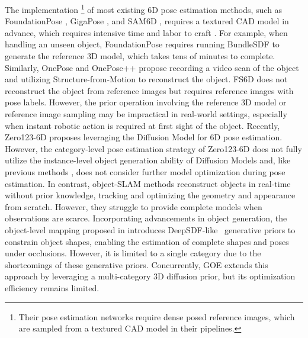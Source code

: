 The implementation \footnote{Their pose estimation networks require dense posed reference images, which are sampled from a textured CAD model in their pipelines.} of most existing 6D pose estimation methods, such as FoundationPose \cite{fp}, GigaPose \cite{gigapose}, and SAM6D \cite{sam6d}, requires a textured CAD model in advance, which requires intensive time and labor to craft \cite{lpr}. For example, when handling an unseen object, FoundationPose \cite{fp} requires running BundleSDF \cite{bundlesdf} to generate the reference 3D model, which takes tens of minutes to complete. Similarly, OnePose \cite{onepose} and OnePose++ \cite{onepose++} propose recording a video scan of the object and utilizing Structure-from-Motion \cite{colmap} to reconstruct the object. FS6D \cite{fs6d} does not reconstruct the object from reference images but requires reference images with pose labels. However, the prior operation involving the reference 3D model or reference image sampling may be impractical in real-world settings, especially when instant robotic action is required at first sight of the object. Recently, Zero123-6D \cite{zero1236d} proposes leveraging the Diffusion Model for 6D pose estimation. However, the category-level pose estimation strategy of Zero123-6D does not fully utilize the instance-level object generation ability of Diffusion Models \cite{wonder3d,zero123++} and, like previous methods \cite{fp,gigapose,sam6d,onepose,onepose++,fs6d}, does not consider further model optimization during pose estimation. In contrast, object-SLAM methods \cite{xu2019mid, bundlesdf} reconstruct objects in real-time without prior knowledge, tracking and optimizing the geometry \cite{mvdeepsdf} and appearance \cite{yanglearning,unigaussian} from scratch. However, they struggle to provide complete models when observations are scarce. Incorporating advancements in object generation, the object-level mapping proposed in \cite{xu2022learning} introduces DeepSDF-like~\cite{mvdeepsdf} generative priors to constrain object shapes, enabling the estimation of complete shapes and poses under occlusions. However, it is limited to a single category due to the shortcomings of these generative priors. Concurrently, GOE \cite{liao2024toward} extends this approach by leveraging a multi-category 3D diffusion prior, but its optimization efficiency remains limited.


